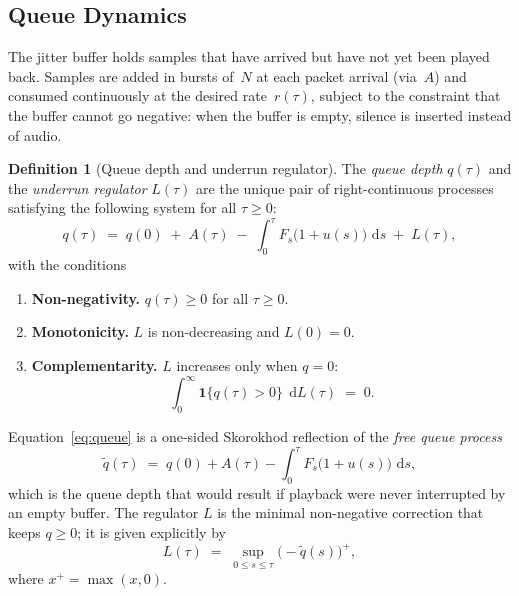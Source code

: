 \documentclass[11pt, a4paper]{article}
\theoremstyle{definition}
\newtheorem{definition}{Definition}[section]
\theoremstyle{plain}
\theoremstyle{remark}
\newcommand{\dd}{\,\mathrm{d}}                   %
\begin{document}
\subsection{Queue Dynamics}\label{sec:queue}

The jitter buffer holds samples that have arrived but have not yet
been played back.  Samples are added in bursts of~$N$ at each packet
arrival (via~$A$) and consumed continuously at the desired rate~$r(\tau)$,
subject to the constraint that the buffer cannot go negative: when the
buffer is empty, silence is inserted instead of audio.

\begin{definition}[Queue depth and underrun regulator]\label{def:queue}
  The \emph{queue depth} $q(\tau)$ and the \emph{underrun regulator}
  $L(\tau)$ are the unique pair of right-continuous processes satisfying
  the following system for all $\tau \ge 0$:
  \begin{equation}\label{eq:queue}
    q(\tau) \;=\; q(0) \;+\; A(\tau)
             \;-\; \int_0^{\tau} F_s\bigl(1 + u(s)\bigr)\,\dd s
             \;+\; L(\tau),
  \end{equation}
  with the conditions
  \begin{enumerate}[label=(\roman*)]
    \item \textbf{Non-negativity.}\; $q(\tau) \ge 0$ for all
      $\tau \ge 0$.
    \item \textbf{Monotonicity.}\; $L$ is non-decreasing and
      $L(0) = 0$.
    \item \textbf{Complementarity.}\; $L$ increases only when $q = 0$:
      \begin{equation}\label{eq:complementarity}
        \int_0^{\infty} \mathbf{1}\{q(\tau) > 0\}\;\dd L(\tau) \;=\; 0.
      \end{equation}
  \end{enumerate}
\end{definition}

Equation~\eqref{eq:queue} is a one-sided Skorokhod reflection of the
\emph{free queue process}
\begin{equation}\label{eq:free-queue}
  \tilde{q}(\tau) \;=\; q(0) + A(\tau)
    - \int_0^{\tau} F_s\bigl(1 + u(s)\bigr)\,\dd s,
\end{equation}
which is the queue depth that would result if playback were never
interrupted by an empty buffer.
The regulator $L$ is the minimal non-negative correction that keeps
$q \ge 0$; it is given explicitly by
\begin{equation}\label{eq:regulator-explicit}
  L(\tau) \;=\; \sup_{0 \le s \le \tau}
    \bigl(-\tilde{q}(s)\bigr)^{\!+},
\end{equation}
where $x^+ = \max(x, 0)$.
\end{document}
